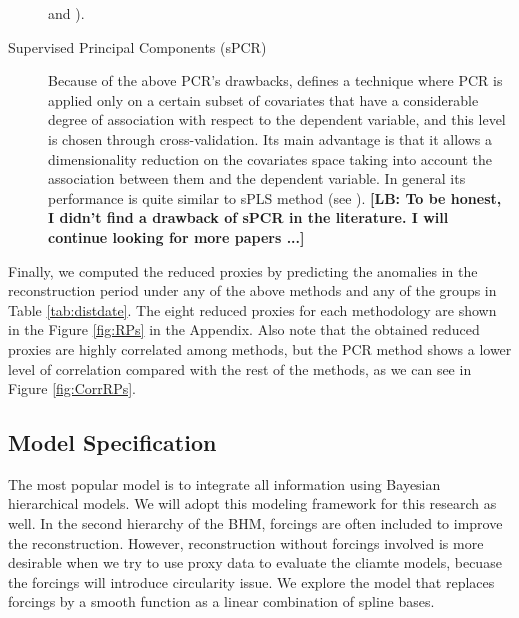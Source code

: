 \documentclass[11pt]{amsart}
\theoremstyle{plain}
\theoremstyle{definition}
\theoremstyle{remark}
\newcommand{\lb}[1]{\color{MidnightBlue}\textbf{[LB: #1]}\normalcolor}
\begin{document}
\begin{description}
\cite{Jolliffe1982} and \cite{Tibshirani1996}). 
\item[Supervised Principal Components (sPCR)]
Because of the above PCR's drawbacks, \cite{Bair2006} defines a technique where PCR is applied only
on a certain subset of covariates that have a considerable degree of association
with respect to the dependent variable, and this level is chosen through
cross-validation. Its main advantage is that it allows a dimensionality
reduction on the covariates space taking into account the association between
them and the dependent variable. In general its performance is quite similar to
sPLS method (see \cite{Chung2013}). \lb{To be honest, I didn't find a drawback of
  sPCR in the literature. I will continue looking for more papers ...} 
\end{description}
Finally, we computed the reduced proxies by predicting the anomalies in the
reconstruction period under any of the above methods and any of the groups in
Table \ref{tab:distdate}. The eight reduced proxies for each methodology are
shown in the Figure \ref{fig:RPs} in the Appendix. Also note that
the obtained reduced proxies are highly correlated among methods, but the PCR
method shows a lower level of correlation compared with the rest of the methods,
as we can see in Figure \ref{fig:CorrRPs}.  

\subsection{Model Specification}
\label{sec:modelspec}
The most popular model is to integrate all information using Bayesian hierarchical models. We will adopt this modeling framework for this research as well. In the second hierarchy of the BHM, forcings are often included to improve the reconstruction. However, reconstruction without forcings involved is more desirable when we try to use proxy data to evaluate the cliamte models, becuase the forcings will introduce circularity issue. We explore the model that replaces forcings by a smooth function as a linear combination of spline bases.
\end{document}
